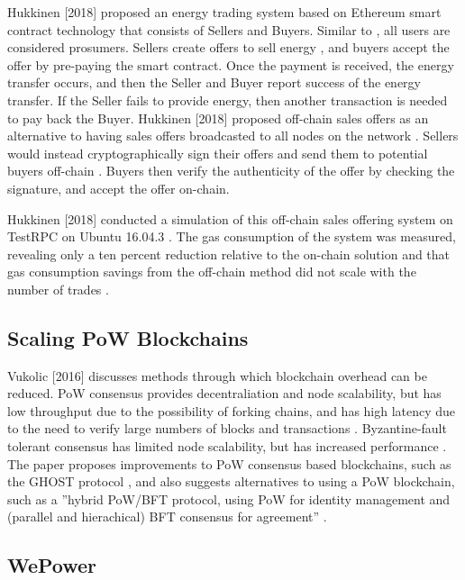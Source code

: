 Hukkinen [2018] proposed an energy trading system based on Ethereum smart contract technology that consists of Sellers and Buyers. Similar to \cite{HSLC17}, all users are considered prosumers. Sellers create offers to sell energy \cite[p.28]{Huk18}, and buyers accept the offer by pre-paying the smart contract. Once the payment is received, the energy transfer occurs, and then the Seller and Buyer report success of the energy transfer. If the Seller fails to provide energy, then another transaction is needed to pay back the Buyer. Hukkinen [2018] proposed off-chain sales offers as an alternative to having sales offers broadcasted to all nodes on the network \cite[p.41]{Huk18}. Sellers would instead cryptographically sign their offers and send them to potential buyers off-chain \cite[p.42]{Huk18}. Buyers then verify the authenticity of the offer by checking the signature, and accept the offer on-chain.

Hukkinen [2018] conducted a simulation of this off-chain sales offering system on TestRPC on Ubuntu 16.04.3 \cite[p.47]{Huk18}. The gas consumption of the system was measured, revealing only a ten percent reduction relative to the on-chain solution \cite[p.52]{Huk18} and that gas consumption savings from the off-chain method did not scale with the number of trades \cite[p.48]{Huk18}.

\subsection{Scaling PoW Blockchains}

Vukolic [2016] discusses methods through which blockchain overhead can be reduced. PoW consensus provides decentraliation and node scalability, but has low throughput due to the possibility of forking chains, and has high latency due to the need to verify large numbers of blocks and transactions \cite[p.4]{Vuk16}. Byzantine-fault tolerant consensus has limited node scalability, but has increased performance \cite[p.4]{Vuk16}. The paper proposes improvements to PoW consensus based blockchains, such as the GHOST protocol \cite[p.9]{Vuk16}, and also suggests alternatives to using a PoW blockchain, such as a ”hybrid PoW/BFT protocol, using PoW for identity management and (parallel and hierachical) BFT consensus for agreement” \cite[p.11]{Vuk16}.

\subsection{WePower}

